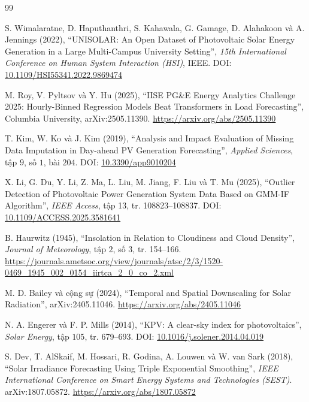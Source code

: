\begin{thebibliography}{99}

S. Wimalaratne, D. Haputhanthri, S. Kahawala, G. Gamage, D. Alahakoon và A. Jennings (2022),
``UNISOLAR: An Open Dataset of Photovoltaic Solar Energy Generation in a Large Multi-Campus
University Setting'',
\textit{15th International Conference on Human System Interaction (HSI)}, IEEE.
DOI: \href{https://doi.org/10.1109/HSI55341.2022.9869474}{10.1109/HSI55341.2022.9869474}

M. Roy, V. Pyltsov và Y. Hu (2025),
``IISE PG\&E Energy Analytics Challenge 2025: Hourly-Binned Regression Models Beat
Transformers in Load Forecasting'',
Columbia University, arXiv:2505.11390.
\url{https://arxiv.org/abs/2505.11390}

T. Kim, W. Ko và J. Kim (2019),
``Analysis and Impact Evaluation of Missing Data Imputation in Day-ahead PV Generation
Forecasting'',
\textit{Applied Sciences}, tập $9$, số $1$, bài $204$.
DOI: \href{https://doi.org/10.3390/app9010204}{10.3390/app9010204}

X. Li, G. Du, Y. Li, Z. Ma, L. Liu, M. Jiang, F. Liu và T. Mu (2025),
``Outlier Detection of Photovoltaic Power Generation System Data Based on GMM-IF
Algorithm'',
\textit{IEEE Access}, tập 13, tr. 108823--108837.
DOI: \href{https://doi.org/10.1109/ACCESS.2025.3581641}{10.1109/ACCESS.2025.3581641}

B. Haurwitz (1945),
``Insolation in Relation to Cloudiness and Cloud Density'',
\textit{Journal of Meteorology}, tập $2$, số $3$, tr. 154--166.
\url{https://journals.ametsoc.org/view/journals/atsc/2/3/1520-0469_1945_002_0154_iirtca_2_0_co_2.xml}

M. D. Bailey và cộng sự (2024),
``Temporal and Spatial Downscaling for Solar Radiation'',
arXiv:2405.11046. \url{https://arxiv.org/abs/2405.11046}

N. A. Engerer và F. P. Mills (2014),
``KPV: A clear-sky index for photovoltaics'',
\textit{Solar Energy}, tập $105$, tr. 679--693.
DOI: \href{https://doi.org/10.1016/j.solener.2014.04.019}{10.1016/j.solener.2014.04.019}

S. Dev, T. AlSkaif, M. Hossari, R. Godina, A. Louwen và W. van Sark (2018),
``Solar Irradiance Forecasting Using Triple Exponential Smoothing'',
\textit{IEEE International Conference on Smart Energy Systems and Technologies (SEST)}.
arXiv:1807.05872. \url{https://arxiv.org/abs/1807.05872}


\end{thebibliography}
